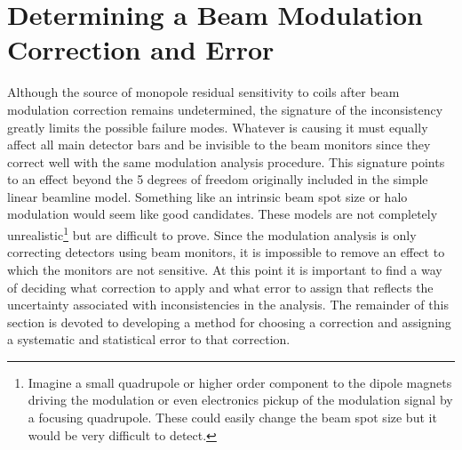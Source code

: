 \section{Determining a Beam Modulation Correction and Error}
Although the source of monopole residual sensitivity to coils after beam modulation correction remains undetermined, the signature of the inconsistency greatly limits the possible failure modes. Whatever is causing it must equally affect all main detector bars and be invisible to the beam monitors since they correct well with the same modulation analysis procedure. This signature points to an effect beyond the 5 degrees of freedom originally included in the simple linear beamline model. Something like an intrinsic beam spot size or halo modulation would seem like good candidates. These models are not completely unrealistic\footnote{Imagine a small quadrupole or higher order component to the dipole magnets driving the modulation or even electronics pickup of the modulation signal by a focusing quadrupole. These could easily change the beam spot size but it would be very difficult to detect.} but are difficult to prove. Since the modulation analysis is only correcting detectors using beam monitors, it is impossible to remove an effect to which the monitors are not sensitive. At this point it is important to find a way of deciding what correction to apply and what error to assign that reflects the uncertainty associated with inconsistencies in the analysis. The remainder of this section is devoted to developing a method for choosing a correction and assigning a systematic and statistical error to that correction.

